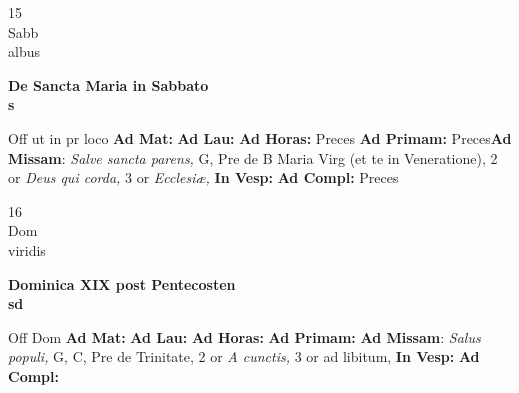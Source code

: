 \documentclass[10pt, openany]{book}
\begin{document}
    \begin{center}
        \begin{minipage}{3.5in}
            \vspace{2em}
            \begin{minipage}{0.5in}
                {\Huge 15} \\
                {\normalsize Sabb} \\
                {\normalsize albus}
            \end{minipage}
            \begin{minipage}{3.0in}
                \textbf{ \large De Sancta Maria in Sabbato \\
                \textnormal{\normalsize s}} \\ 
            \end{minipage}
            \begin{justify}Off ut in pr loco
                \textbf{Ad Mat: }
                \textbf{Ad Lau: }
                \textbf{Ad Horas: }Preces
                \textbf{Ad Primam: }Preces\textbf{Ad Missam}: \textit{Salve sancta parens,} G, Pre de B Maria Virg (et te in Veneratione), 2 or \textit{Deus qui corda,} 3 or \textit{Ecclesiæ,}  
                \textbf{In Vesp: }
                \textbf{Ad Compl: }Preces
            \end{justify}
        \end{minipage}
    \end{center}

    \begin{center}
        \begin{minipage}{3.5in}
            \vspace{2em}
            \begin{minipage}{0.5in}
                {\Huge 16} \\
                {\normalsize Dom} \\
                {\normalsize viridis}
            \end{minipage}
            \begin{minipage}{3.0in}
                \textbf{ \large Dominica XIX post Pentecosten \\
                \textnormal{\normalsize sd}} \\ 
            \end{minipage}
            \begin{justify}Off Dom
                \textbf{Ad Mat: }
                \textbf{Ad Lau: }
                \textbf{Ad Horas: }
                \textbf{Ad Primam: }\textbf{Ad Missam}: \textit{Salus populi,} G, C, Pre de Trinitate, 2 or \textit{A cunctis,} 3 or ad libitum,  
                \textbf{In Vesp: }
                \textbf{Ad Compl: }
            \end{justify}
        \end{minipage}
    \end{center}
\end{document}
